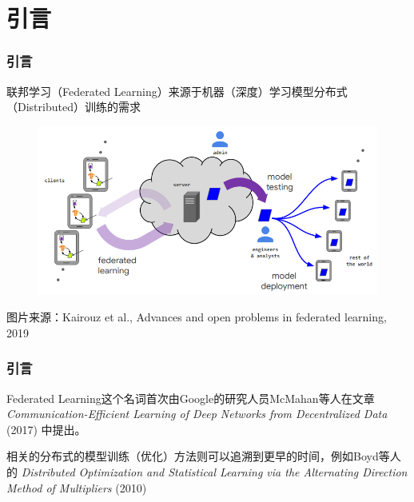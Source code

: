 





\section{引言}


\begin{frame}
\frametitle{引言}

联邦学习（Federated Learning）来源于机器（深度）学习模型分布式（Distributed）训练的需求

\begin{figure}
    \centering
    \includegraphics[width=\textwidth,keepaspectratio]{images/fl_overview.png}
\end{figure}

{\footnotesize
图片来源：Kairouz et al., Advances and open problems in federated learning, 2019
}

\end{frame}


\begin{frame}
\frametitle{引言}

Federated Learning这个名词首次由Google的研究人员McMahan等人在文章 \emph{Communication-Efficient Learning of Deep Networks from Decentralized Data} (2017)  中提出。

\vspace{3em}
\pause

相关的分布式的模型训练（优化）方法则可以追溯到更早的时间，例如Boyd等人的 \emph{Distributed Optimization and Statistical Learning via the Alternating Direction Method of Multipliers} (2010)

\end{frame}

